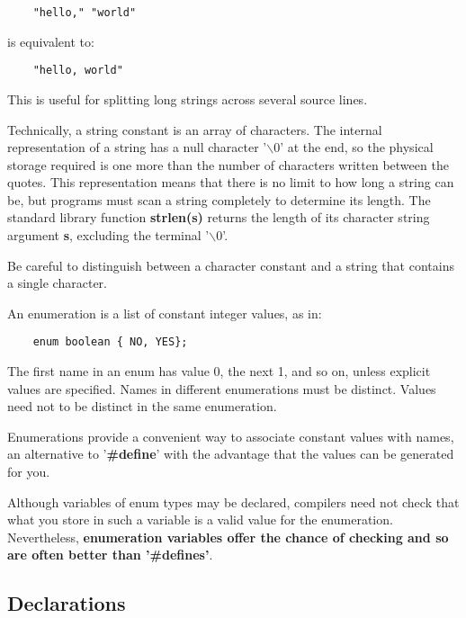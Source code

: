 \documentclass{article}
\begin{document}
\begin{lstlisting}
	"hello," "world"
\end{lstlisting}

\vspace{8pt}

is equivalent to:

\begin{lstlisting}
	"hello, world"
\end{lstlisting}

This is useful for splitting long strings across several source lines.

Technically, a string constant is an array of characters. The internal representation of a string has a null character '$\backslash$0' at the end, so the physical storage required is one more than the number of characters written between the quotes. This representation means that there is no limit to how long a string can be, but programs must scan a string completely to determine its length. The standard library function \textbf{strlen(s)} returns the length of its character string argument \textbf{s}, excluding the terminal '$\backslash$0'.

Be careful to distinguish between a character constant and a string that contains a single character.

An enumeration is a list of constant integer values, as in:

\begin {lstlisting}
	enum boolean { NO, YES};
\end{lstlisting}

The first name in an enum has value 0, the next 1, and so on, unless explicit values are specified. 
Names in different enumerations must be distinct. Values need not to be distinct in the same enumeration.

Enumerations provide a convenient way to associate constant values with names, an alternative to '\textbf{\#define}' with the advantage that the values can be generated for you. 

Although variables of enum types may be declared, compilers need not check that what you store in such a variable is a valid value for the enumeration. Nevertheless, \textbf{enumeration variables offer the chance of checking and so are often better than '\#defines'}.

\subsection{Declarations}
\end{document}
